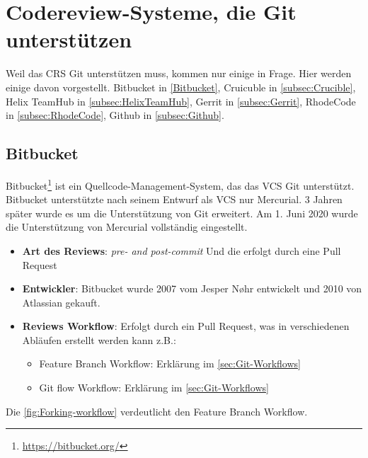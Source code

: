 \section{Codereview-Systeme, die Git unterstützen}
\label{sec:CRS-Git}

Weil das \ac{CRS} Git unterstützen muss, kommen nur einige in Frage. Hier werden einige davon vorgestellt. Bitbucket in \cref{Bitbucket}, Cruicuble in \cref{subsec:Crucible}, Helix TeamHub in \cref{subsec:HelixTeamHub}, Gerrit in \cref{subsec:Gerrit}, RhodeCode in \cref{subsec:RhodeCode}, Github in \cref{subsec:Github}.

\subsection{Bitbucket}
\label{subsec:Bitbucket}

Bitbucket\footnote{\url{https://bitbucket.org/}} ist ein Quellcode-Management-System, das das \ac{VCS} Git unterstützt. Bitbucket unterstützte nach seinem Entwurf als \ac{VCS} nur Mercurial. 3 Jahren später wurde es um die Unterstützung von Git erweitert. Am 1. Juni 2020 wurde die Unterstützung von Mercurial vollständig eingestellt.

\begin{itemize}
	\item \textbf{Art des Reviews}: \textit{pre- and post-commit} Und die erfolgt durch eine Pull Request
	\item \textbf{Entwickler}: Bitbucket wurde 2007 vom Jesper Nøhr entwickelt und 2010 von Atlassian
		 gekauft.
	\item \textbf{Reviews Workflow}: Erfolgt durch ein Pull Request, was in verschiedenen Abläufen erstellt werden kann z.B.:
		\begin{itemize}
			\item Feature Branch Workflow: Erklärung im \cref{sec:Git-Workflows}
			\item Git flow Workflow: Erklärung im \cref{sec:Git-Workflows}
		\end{itemize}
\end{itemize}

Die \cref{fig:Forking-workflow} verdeutlicht den Feature Branch Workflow.

